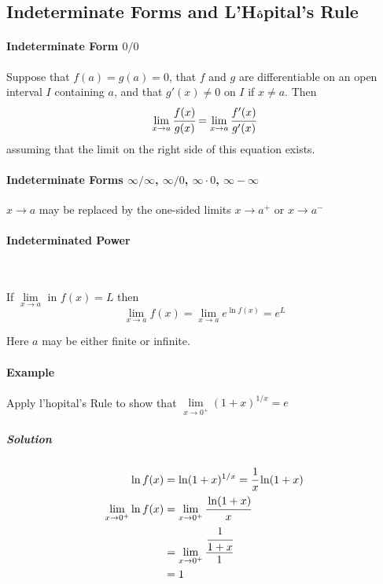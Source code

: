 \documentclass{article}
\begin{document}
        \subsection{Indeterminate Forms and L'H$\bf{\hat{o}}$pital's Rule}
            \paragraph{Indeterminate Form $0/0$} Suppose that $f(a)=g(a)=0$, that $f$ and $g$ are differentiable on an open interval $I$ containing $a$, and that $g'(x)\ne 0$ on $I$ if $x\ne a$. Then
            \[\lim\limits_{x\to a}\cfrac{f(x)}{g(x)}=\lim\limits_{x\to a}\cfrac{f'(x)}{g'(x)}\]
            assuming that the limit on the right side of this equation exists.
            \paragraph{Indeterminate Forms $\infty/\infty$, $\infty/0$, $\infty\cdot 0$, $\infty-\infty$}
            $x\to a$ may be replaced by the one-sided limits $x\to a^{+}$ or $x\to a^{-}$
            \paragraph{Indeterminated Power}
            \text{}\\
            \par If $\lim\limits_{x\to a}$ in $f(x)=L$ then 
            \[\lim\limits_{x\to a}f(x)=\lim\limits_{x\to a}e^{\ln f(x)} =e^L\]
            \par Here $a$ may be either finite or infinite.
            \paragraph{Example} Apply l'hopital's Rule to show that $\lim\limits_{x\to 0^{+}} (1+x)^{1/x}=e$
            \subparagraph{Solution}
            \begin{equation}
                \begin{aligned}
                    \ln f(x)&=\ln (1+x)^{1/x}=\cfrac{1}{x}\ln (1+x)\\
                    \lim\limits_{x\to 0^+} \ln f(x)&=\lim\limits_{x\to 0^+}\cfrac{\ln (1+x)}{x}\\
                    &=\lim\limits_{x\to 0^+}\cfrac{\cfrac{1}{1+x}}{1}\\
                    &=1\\
                \end{aligned}                
            \end{equation}
\end{document}
